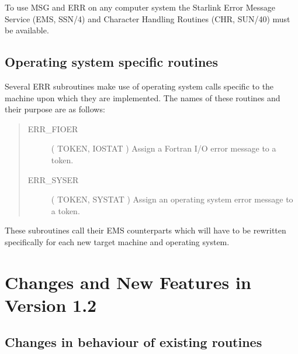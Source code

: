 To use MSG and ERR on any computer system the Starlink Error Message Service
(EMS, SSN/4) and Character Handling Routines (CHR, SUN/40) must be available.


\subsection {Operating system specific routines}

Several ERR subroutines make use of operating system calls specific to the 
machine upon which they are implemented.
The names of these routines and their purpose are as follows:

\begin {quote}
\begin {description}
\item [ERR\_FIOER] ( TOKEN, IOSTAT ) 
\subitem Assign a Fortran I/O error message to a token.
\indexspace
\item [ERR\_SYSER] ( TOKEN, SYSTAT ) 
\subitem Assign an operating system error message to a token.
\end {description}
\end {quote}

These subroutines call their EMS counterparts which will have to be rewritten
specifically for each new target machine and operating system.


\section {Changes and New Features in Version 1.2}

\subsection {Changes in behaviour of existing routines}

